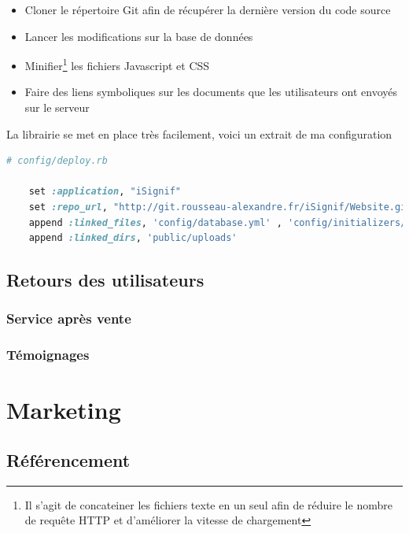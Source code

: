 \documentclass[]{report}
\begin{document}
    \begin{itemize}
      \item Cloner le répertoire Git afin de récupérer la dernière version du code source
      \item Lancer les modifications sur la base de données
      \item Minifier\footnote{Il s'agit de concateiner les fichiers texte en un seul afin de réduire le nombre de requête HTTP et d'améliorer la vitesse de chargement} les fichiers Javascript et CSS
      \item Faire des liens symboliques sur les documents que les utilisateurs ont envoyés sur le serveur
    \end{itemize}

    La librairie se met en place très facilement, voici un extrait de ma configuration

    \begin{scriptsize}
    \begin{lstlisting}[language=ruby]
    # config/deploy.rb

    set :application, "iSignif"
    set :repo_url, "http://git.rousseau-alexandre.fr/iSignif/Website.git"
    append :linked_files, 'config/database.yml' , 'config/initializers/secret_token.rb', 'config/secrets.yml'
    append :linked_dirs, 'public/uploads'
    \end{lstlisting}
    \end{scriptsize}

  \section{Retours des utilisateurs}\label{sec:feedback}

    \subsection{Service après vente}


    \subsection{Témoignages}


\chapter{Marketing}

  \section{Référencement}
\end{document}
